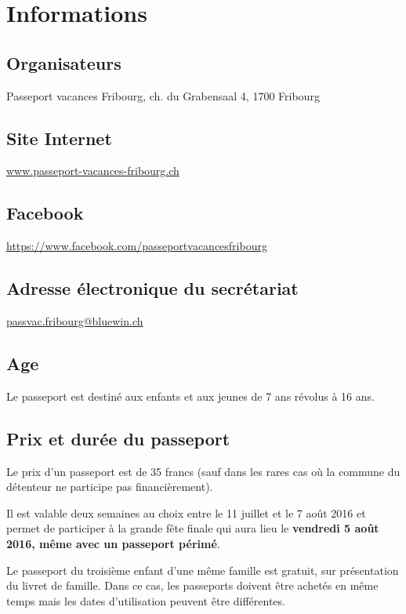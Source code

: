 \chapter{Informations}

\section*{Organisateurs}

Passeport vacances Fribourg, ch. du Grabensaal 4, 1700 Fribourg

\section*{Site Internet}

\url{www.passeport-vacances-fribourg.ch}

\section*{Facebook}

\url{https://www.facebook.com/passeportvacancesfribourg}

\section*{Adresse électronique du secrétariat}

\url{passvac.fribourg@bluewin.ch}

\section*{Age}

Le passeport est destiné aux enfants et aux jeunes de 7 ans révolus à 16 ans.

\section*{Prix et durée du passeport}

Le prix d'un passeport est de 35 francs (sauf dans les rares cas où la commune du détenteur ne participe pas financièrement). 

Il est valable deux semaines au choix entre le 11 juillet et le 7 août 2016 et permet de participer à la grande fête finale qui aura lieu le \textbf{vendredi 5 août 2016, même avec un passeport périmé}. 

Le passeport du troisième enfant d'une même famille est gratuit, sur présentation du livret de famille. Dans ce cas, les passeports doivent être achetés en même temps mais les dates d'utilisation peuvent être différentes. 

